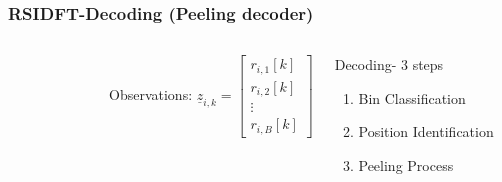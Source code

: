 \documentclass[10pt,xcolor=table]{beamer}
\newcommand{\zv}{\underline{z}}
\newcommand{\rv}{\underline{r}}
\begin{document}
\begin{frame}\frametitle{RSIDFT-Decoding (Peeling decoder)}
\begin{columns}
		\begin{figure}[h!]
			\begin{center}
				\resizebox{1.0\textwidth}{!}{}	
			\end{center}	
		\end{figure}
	    \begin{block}{Observations:}
	          $
	    		\zv_{i,k} = \begin{bmatrix}
	    		r_{i,1}[k]\\
	    		r_{i,2}[k]\\
	    		\vdots\\
	    		r_{i,B}[k]
	    		\end{bmatrix}
	    		$
	    	\end{block}
	    	\begin{block}{Decoding- 3 steps}	
	    		\begin{enumerate}
	    			\item Bin Classification
	    			\item Position Identification
	    			\item Peeling Process
	    		\end{enumerate}
	
	    \end{block}
	
		
\end{columns}	
\end{frame}
\end{document}
